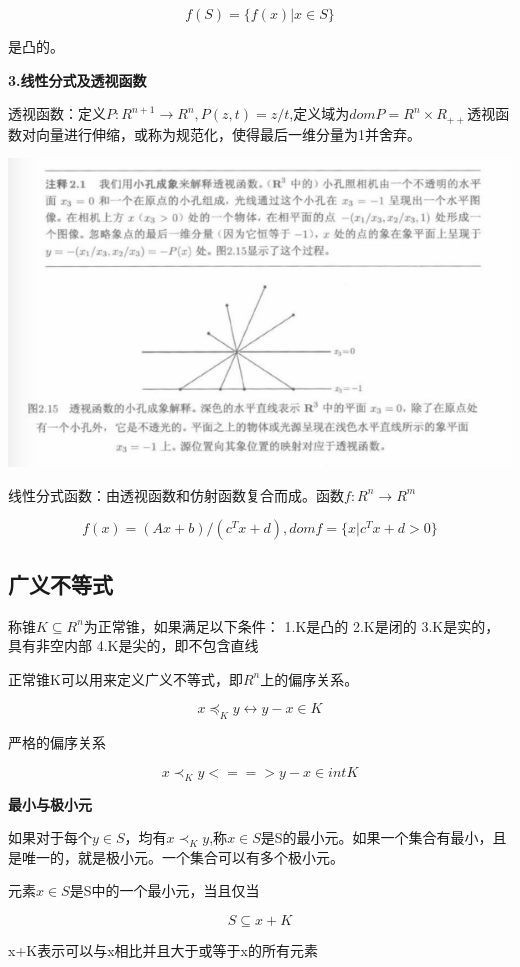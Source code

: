 \documentclass{ctexart}
\begin{document}
	\[f(S)=\{f(x)|x\in S\}\]

	是凸的。
	
	\textbf{3.线性分式及透视函数}
	
	透视函数：定义\(P:R^{n+1} \to R^n, P(z,t)=z/t\),定义域为\(domP=R^n\times R_{++}\)透视函数对向量进行伸缩，或称为规范化，使得最后一维分量为1并舍弃。
	
	\includegraphics[width=1\linewidth]{pic/pic2_15}
	
	线性分式函数：由透视函数和仿射函数复合而成。函数\(f:R^n \to R^m\)
	
	\[f(x)=(Ax+b)/(c^Tx+d), dom f=\{x|c^Tx+d > 0\}\]
	
	\subsection{广义不等式}
	
	称锥\(K \subseteq R^n\)为正常锥，如果满足以下条件：
	1.K是凸的
	2.K是闭的
	3.K是实的，具有非空内部
	4.K是尖的，即不包含直线
	
	正常锥K可以用来定义广义不等式，即\(R^n\)上的偏序关系。
	
	\[x \preceq_K y \leftrightarrow y-x \in K\]
	
	严格的偏序关系
	
	\[x \prec_K y <==> y-x \in int K\]
	
	\textbf{最小与极小元}
	
	如果对于每个\(y \in S\)，均有\(x \prec_K y\),称\(x \in S\)是S的最小元。如果一个集合有最小，且是唯一的，就是极小元。一个集合可以有多个极小元。
	
	元素\(x \in S\)是S中的一个最小元，当且仅当
	
	\[S \subseteq x+K\]
	
	x+K表示可以与x相比并且大于或等于x的所有元素
	
\end{document}
